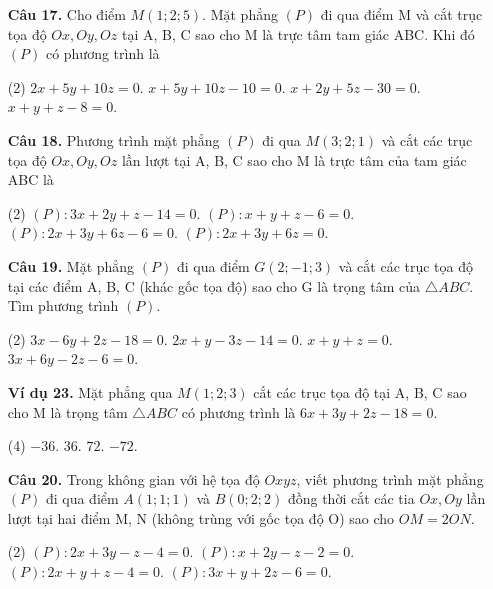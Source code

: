 \documentclass[12pt, a4paper]{article}
\begin{document}
\begin{enumerate}[label=\textbf{\arabic*.}, wide=0pt, leftmargin=*]
    \item[\textbf{Câu 17.}] Cho điểm \(M(1;2;5)\). Mặt phẳng \((P)\) đi qua điểm M và cắt trục tọa độ \(Ox, Oy, Oz\) tại A, B, C sao cho M là trực tâm tam giác ABC. Khi đó \((P)\) có phương trình là
    \begin{tasks}(2)
        \task \(2x+5y+10z=0\).
        \task \(x+5y+10z-10=0\).
        \task \(x+2y+5z-30=0\).
        \task \(x+y+z-8=0\).
    \end{tasks}
    
    \item[\textbf{Câu 18.}] Phương trình mặt phẳng \((P)\) đi qua \(M(3;2;1)\) và cắt các trục tọa độ \(Ox, Oy, Oz\) lần lượt tại A, B, C sao cho M là trực tâm của tam giác ABC là
    \begin{tasks}(2)
        \task \((P): 3x+2y+z-14=0\).
        \task \((P): x+y+z-6=0\).
        \task \((P): 2x+3y+6z-6=0\).
        \task \((P): 2x+3y+6z=0\).
    \end{tasks}
    
    \item[\textbf{Câu 19.}] Mặt phẳng \((P)\) đi qua điểm \(G(2;-1;3)\) và cắt các trục tọa độ tại các điểm A, B, C (khác gốc tọa độ) sao cho G là trọng tâm của \(\triangle ABC\). Tìm phương trình \((P)\).
    \begin{tasks}(2)
        \task \(3x-6y+2z-18=0\).
        \task \(2x+y-3z-14=0\).
        \task \(x+y+z=0\).
        \task \(3x+6y-2z-6=0\).
    \end{tasks}
    
    
    \item[\textbf{Ví dụ 23.}] Mặt phẳng qua \(M(1;2;3)\) cắt các trục tọa độ tại A, B, C sao cho M là trọng tâm \(\triangle ABC\) có phương trình là \(6x+3y+2z-18=0\).
    \begin{tasks}(4)
        \task \(-36\).
        \task \(36\).
        \task \(72\).
        \task \(-72\).
    \end{tasks}
    
    \item[\textbf{Câu 20.}] Trong không gian với hệ tọa độ \(Oxyz\), viết phương trình mặt phẳng \((P)\) đi qua điểm \(A(1;1;1)\) và \(B(0;2;2)\) đồng thời cắt các tia \(Ox, Oy\) lần lượt tại hai điểm M, N (không trùng với gốc tọa độ O) sao cho \(OM=2ON\).
    \begin{tasks}(2)
        \task \((P): 2x+3y-z-4=0\).
        \task \((P): x+2y-z-2=0\).
        \task \((P): 2x+y+z-4=0\).
        \task \((P): 3x+y+2z-6=0\).
    \end{tasks}
    

\end{enumerate}
\end{document}
